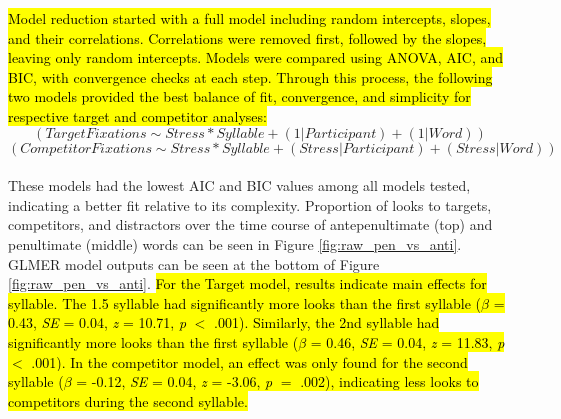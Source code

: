 \hl{Model reduction started with a full model including random intercepts, slopes, and their correlations. Correlations were removed first, followed by the slopes, leaving only random intercepts. Models were compared using ANOVA, AIC, and BIC, with convergence checks at each step. Through this process, the following two models provided the best balance of fit, convergence, and simplicity for respective target and competitor analyses:} $$(Target  Fixations \sim Stress * Syllable + (1|Participant)+(1|Word))$$
$$(Competitor  Fixations \sim Stress * Syllable + (Stress|Participant)+(Stress|Word))$$\\
These models had the lowest AIC and BIC values among all models tested, indicating a better fit relative to its complexity. Proportion of looks to targets, competitors, and distractors over the time course of antepenultimate (top) and penultimate (middle) words can be seen in Figure \ref{fig:raw_pen_vs_anti}. GLMER model outputs can be seen at the bottom of Figure \ref{fig:raw_pen_vs_anti}. \hl{For the Target model, results indicate main effects for syllable. The  1.5 syllable had significantly more looks than the first syllable ($\beta$ = 0.43, \textit{SE} = 0.04, \textit{z} = 10.71, \textit{p} $<$ .001). Similarly, the 2nd syllable had significantly more looks than the first syllable ($\beta$ = 0.46, \textit{SE} = 0.04, \textit{z} = 11.83, \textit{p} $<$ .001). In the competitor model, an effect was only found for the second syllable ($\beta$ = -0.12, \textit{SE} = 0.04, \textit{z} = -3.06, \textit{p} $=$ .002), indicating less looks to competitors during the second syllable.}

